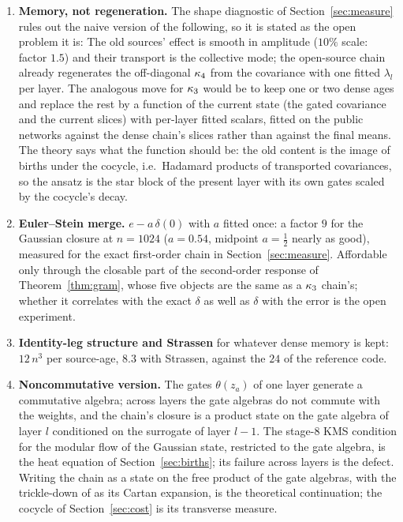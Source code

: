 \begin{enumerate}[nosep]
\item \textbf{Memory, not regeneration.} The shape diagnostic of Section~\ref{sec:measure} rules out the naive
version of the following, so it is stated as the open problem it is:  The old sources' effect is smooth in amplitude ($10\%$
scale: factor $1.5$) and their transport is the collective mode; the open-source chain already regenerates the
off-diagonal $\kappa_4$ from the covariance with one fitted $\lambda_l$ per layer. The analogous move for $\kappa_3$ would be
to keep one or two dense ages and replace the rest by a function of the current state (the gated covariance and
the current slices) with per-layer fitted scalars, fitted on the public networks against the dense chain's slices
rather than against the final means. The theory says what the function should be: the old content is the image
of births under the cocycle, i.e.\ Hadamard products of transported covariances, so the ansatz is the star block
of the present layer with its own gates scaled by the cocycle's decay.
\item \textbf{Euler--Stein merge.} $e-a\,\delta(0)$ with $a$ fitted once: a factor $9$ for the Gaussian closure at
$n=1024$ ($a=0.54$, midpoint $a=\tfrac12$ nearly as good), measured for the exact first-order chain in
Section~\ref{sec:measure}. Affordable only through the closable part of the second-order response of
Theorem~\ref{thm:gram}, whose five objects are the same as a $\kappa_3$ chain's; whether it correlates with the exact
$\delta$ as well as $\delta$ with the error is the open experiment.
\item \textbf{Identity-leg structure and Strassen} for whatever dense memory is kept: $12\,n^3$ per source-age, $8.3$
with Strassen, against the $24$ of the reference code.
\item \textbf{Noncommutative version.} The gates $\theta(z_a)$ of one layer generate a commutative algebra; across
layers the gate algebras do not commute with the weights, and the chain's closure is a product state on the gate
algebra of layer $l$ conditioned on the surrogate of layer $l-1$. The stage-8 KMS condition for the modular flow of
the Gaussian state, restricted to the gate algebra, is the heat equation of Section~\ref{sec:births}; its failure
across layers is the defect. Writing the chain as a state on the free product of the gate algebras, with the
trickle-down of \cite{AKV} as its Cartan expansion, is the theoretical continuation; the cocycle of
Section~\ref{sec:cost} is its transverse measure.
\end{enumerate}
